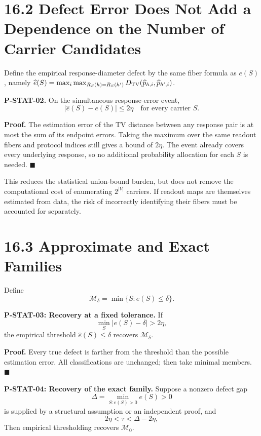\documentclass[
  english,
  11pt,
  oneside]{book}
\begin{document}
\section{16.2 Defect Error Does Not Add a Dependence on the Number of Carrier Candidates}\label{defect-error-does-not-add-a-dependence-on-the-number-of-carrier-candidates}

\hypertarget{p-stat-02}{}\label{p-stat-02}

Define the empirical response-diameter defect by the same fiber formula as \(e(S)\), namely \(\widehat e(S)=\max_i\max_{R_S(h)=R_S(h')}D_{\rm TV}(\widehat p_{h,i},\widehat p_{h',i})\).

\textbf{P-STAT-02.} On the simultaneous response-error event, \[|\widehat e(S)-e(S)|\le2\eta
\quad\text{for every carrier }S.\]

\textbf{Proof.} The estimation error of the TV distance between any response pair is at most the sum of its endpoint errors. Taking the maximum over the same readout fibers and protocol indices still gives a bound of \(2\eta\). The event already covers every underlying response, so no additional probability allocation for each \(S\) is needed. \(\blacksquare\)

This reduces the statistical union-bound burden, but does not remove the computational cost of enumerating \(2^{|V|}\) carriers. If readout maps are themselves estimated from data, the risk of incorrectly identifying their fibers must be accounted for separately.

\section{16.3 Approximate and Exact Families}\label{approximate-and-exact-families}

Define \[\mathcal M_\delta=\min\{S:e(S)\le\delta\}.\]

\hypertarget{p-stat-03}{}\label{p-stat-03}

\textbf{P-STAT-03: Recovery at a fixed tolerance.} If \[\min_S|e(S)-\delta|>2\eta,\] the empirical threshold \(\widehat e(S)\le\delta\) recovers \(\mathcal M_\delta\).

\textbf{Proof.} Every true defect is farther from the threshold than the possible estimation error. All classifications are unchanged; then take minimal members. \(\blacksquare\)

\hypertarget{p-stat-04}{}\label{p-stat-04}

\textbf{P-STAT-04: Recovery of the exact family.} Suppose a nonzero defect gap \[\Delta=\min_{S:e(S)>0}e(S)>0\] is supplied by a structural assumption or an independent proof, and \[2\eta<\tau<\Delta-2\eta,\] Then empirical thresholding recovers \(\mathcal M_0\).
\end{document}
